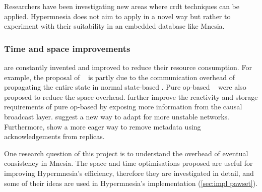 Researchers have been investigating new areas where \acrshort{crdt} techniques
can be applied. Hypermnesia does not aim to apply  in a novel
way but rather to experiment with their suitability in an embedded database like Mnesia.

\subsubsection{Time and space improvements} \label{subsec:related crdt performance}

 are constantly invented and improved to reduce their resource 
consumption.
For example, the proposal of ~\cite{almeida2018DeltaCRDT} is partly
due to the 
communication overhead of propagating the entire state in normal state-based
. Pure op-based ~\cite{baquero2014PureOp} were also 
proposed to reduce the space overhead. \citet{bauwens2021Reactivity}
further improve the reactivity and storage requirements of pure op-based
 by exposing more information from the causal broadcast 
layer. \citet{vanderlinde2016delta-CRDTs} suggest a new way to 
adapt  for more unstable networks.
Furthermore, \citet{bauwens2019crdtmemory} show a more eager way to remove metadata
using acknowledgements from replicas.

One research question of this project is to understand the overhead of
eventual consistency in Mnesia. The space and time optimisations proposed are 
useful for improving Hypermnesia's efficiency,
therefore they are investigated in detail, and some of their ideas are
used in Hypermnesia's implementation (\cref{sec:impl pawset}).

